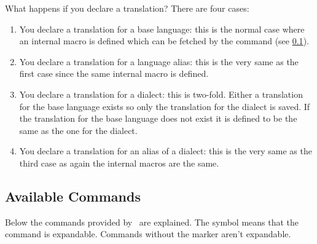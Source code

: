 \documentclass[load-preamble+,babel-options={french,spanish,ngerman,english}]{cnltx-doc}
\begin{document}
What happens if you declare a translation? There are four cases:
\begin{enumerate}
  \item You declare a translation for a base language: this is the normal case
    where an internal macro is defined which can be fetched by the
     command (see \cref{ssec:commands}).
  \item You declare a translation for a language alias: this is the very same
    as the first case since the same internal macro is defined.
  \item You declare a translation for a dialect: this is two-fold.  Either a
    translation for the base language exists so only the translation for the
    dialect is saved.  If the translation for the base language does not exist
    it is defined to be the same as the one for the dialect.
  \item You declare a translation for an alias of a dialect: this is the very
    same as the third case as again the internal macros are the same.
\end{enumerate}

\subsection{Available Commands}\label{ssec:commands}
Below the commands provided by \translations\ are explained.  The symbol
\textcolor{expandable}{\expandablesign} means that the command is expandable.
Commands without the marker aren't expandable.
\end{document}
